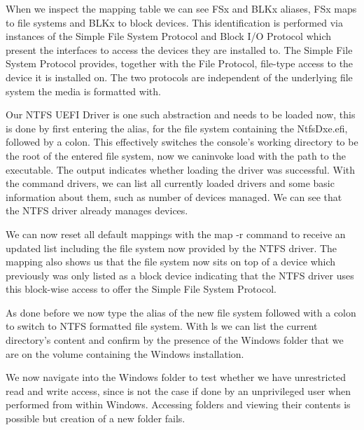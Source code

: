 When we inspect the mapping table we can see FSx and BLKx aliases, FSx maps to file systems and BLKx to block devices. This identification is performed via instances of the Simple File System Protocol and  Block I/O Protocol which present the interfaces to access the devices they are installed to.
The Simple File System Protocol \cite[13.4 Simple File System Protocol]{uefi-spec} provides, together with the File Protocol, file-type access to the device it is installed on. The two protocols are independent of the underlying file system the media is formatted with.


Our NTFS UEFI Driver is one such abstraction and needs to be loaded now, this is done by first entering the alias, for the file system containing the NtfsDxe.efi, followed by a colon.
This effectively switches the console's working directory to be the root of the entered file system, now we caninvoke load with the path to the executable. The output indicates whether loading the driver was successful.
With the command drivers, we can list all currently loaded drivers and some basic information about them, such as number of devices managed. We can see that the NTFS driver already manages devices.

We can now reset all default mappings with the map -r command to receive an updated list including the file system now provided by the NTFS driver. The mapping also shows us that the file system now sits on top of a device which previously was only listed as a block device indicating that the NTFS driver uses this block-wise access to offer the Simple File System Protocol.

As done before we now type the alias of the new file system followed with a colon to switch to NTFS formatted file system. With ls we can list the current directory's content and confirm by the presence of the Windows folder that we are on the volume containing the Windows installation.


We now navigate into the Windows folder to test whether we have unrestricted read and write access, since is not the case if done by an unprivileged user when performed from within Windows. Accessing folders and viewing their contents is possible but creation of a new folder fails.

